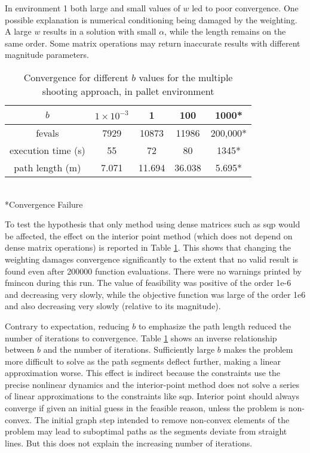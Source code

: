 In environment 1 both large and small values of $w$ led to poor convergence. One possible explanation is numerical conditioning being damaged by the weighting. A large $w$ results in a solution with small $\alpha$, while the length remains on the same order. Some matrix operations may return inaccurate results with different magnitude parameters.
\begin{table}
\begin{center}
	\begin{tabular}{ |c|c|c|c|c| }
		\hline
		 $b$ & $1\times10^{-3}$&  1 & 100 & 1000* \\ 
		 \hline
		 fevals &7929 & 10873 & 11986& 200,000* \\  
		 execution time (s)& 55 & 72 & 80 & 1345* \\
		 path length (m) & 7.071 & 11.694 & 36.038 & 5.695*\\
		 \hline  
	\end{tabular} \\
		 *Convergence Failure
\end{center}
\label{tab:b_dependence}
\caption{Convergence for different $b$ values for the multiple shooting approach, in pallet environment} 
\end{table}
To test the hypothesis that only method using dense matrices such as sqp would be affected, the effect on the interior point method (which does not depend on dense matrix operations) is reported in Table \ref{tab:b_dependence}. This shows that changing the weighting damages convergence significantly to the extent that no valid result is found even after 200000 function evaluations. There were no warnings printed by fmincon during this run. The value of feasibility was positive of the order 1e-6 and decreasing very slowly, while the objective function was large of the order 1e6 and also decreasing very slowly (relative to its magnitude).

Contrary to expectation, reducing $b$ to emphasize the path length reduced the number of iterations to convergence. Table  \ref{tab:b_dependence} shows an inverse relationship between $b$ and the number of iterations. Sufficiently large $b$ makes the problem more difficult to solve as the path segments deflect further, making a linear approximation worse. This effect is indirect because the constraints use the precise nonlinear dynamics and the interior-point method does not solve a series of linear approximations to the constraints like sqp. Interior point should always converge if given an initial guess in the feasible reason, unless the problem is non-convex. The initial graph step intended to remove non-convex elements of the problem may lead to suboptimal paths as the segments deviate from straight lines. But this does not explain the increasing number of iterations. 

